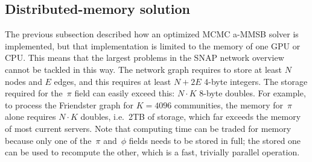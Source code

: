 \begin{comment}
3 subsections:
   1. intro and motivation
   2. design
   3. evaluation

1. intro and motivation
     if K * N exceeds single-host memory need solution: use distributed memory, by
     partitioning pi/phi
     expect things to be memory-access dominated, so:
      - because of speed, cannot use disk or even SSD; fully random accesses, no data
        reuse or locality
      - need fastest remote memory available; introduce RDMA
     trade speed for memory in many places...

2. design
   - use master/worker paradigm

   - memory allocations:
     + distributed key-value store for pi/phi
       choose RDMA read/write; no synch, no concurrency, fixed size for reads
       as well as writes
     + distribute pi/phi over the workers
     + keep the graph at the master
     + distribute the held-out set over the master + workers

   - implementation:
     iterate:
     + master draws mini-batches
     + master scatters mini-batch and graph slice over the W workers
     + workers load pi
     + workers draw neighbors (OpenMP)
     + workers calculate updated phi (m/W * n) (OpenMP)
     + barrier
     + workers calculate and store updated pi (OpenMP)
     + barrier
     + master calculates beta (m) (OpenMP)
     + if perplexity iteration:
       barrier
       master and workers calculate perplexity, summed w/ reduce (OpenMP/MPI)

   - details
     + use google sparseset because std::unordered_set uses 32 bytes of overhead
       per item
     + have a look at RDMA bandwidth as a function of N and W

\end{comment}

\subsection{Distributed-memory solution}

The previous subsection described how an optimized MCMC a-MMSB solver
is implemented, but that implementation is limited to the memory of one
GPU or CPU. This means that the largest problems in the SNAP network
overview cannot be tackled in this way. The network graph requires to
store at least $N$ nodes and $E$ edges, and this requires at least $N +
2E$ 4-byte integers. The storage required for the~$\pi$ field can easily
exceed this: $N \cdot K$ 8-byte doubles. For example, to process the
Friendster graph for $K=4096$ communities, the memory for~$\pi$ alone
requires $N \cdot K$ doubles, i.e.\ 2TB of storage, which far exceeds
the memory of most current servers. Note that computing time can be
traded for memory because only one of the~$\pi$ and~$\phi$ fields needs
to be stored in full; the stored one can be used to recompute the other,
which is a fast, trivially parallel operation.

